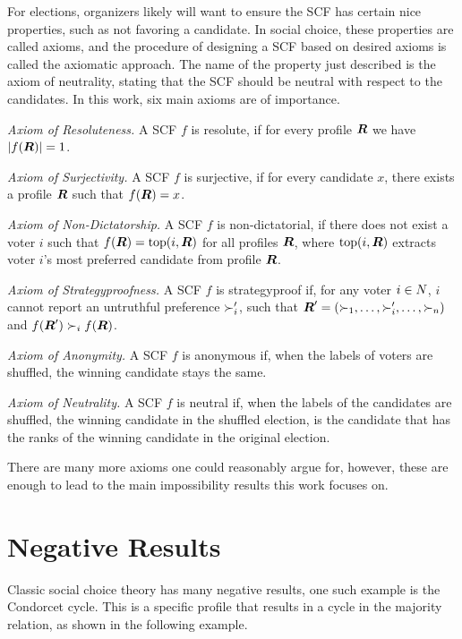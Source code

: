 For elections, organizers likely will want to ensure the SCF has certain
nice properties, such as not favoring a candidate. In social choice, these
properties are called axioms, and the procedure of designing a SCF based on
desired axioms is called the axiomatic approach. The name of the property just
described is the axiom of neutrality, stating that the SCF should be
neutral with respect to the candidates. In this work, six main axioms are of
importance.

\emph{Axiom of Resoluteness.} A SCF $f$ is resolute, if for every profile
$\boldsymbol{R}$ we have $|f(\boldsymbol{R})| = 1$.

\emph{Axiom of Surjectivity.} A SCF $f$ is surjective, if for every candidate
$x$, there exists a profile $\boldsymbol{R}$ such that
$f(\boldsymbol{R}) = x$.

\emph{Axiom of Non-Dictatorship.} A SCF $f$ is non-dictatorial, if there does not exist a voter $i$ such that $f(\boldsymbol{R}) = \textnormal{top}(i,\boldsymbol{R})$ for all profiles $\boldsymbol{R}$, where $\textnormal{top}(i,\boldsymbol{R})$  extracts voter $i$'s most preferred candidate from profile $\boldsymbol{R}$.

\emph{Axiom of Strategyproofness.} A SCF $f$ is strategyproof if, for any
voter $i \in N$, $i$ cannot report an untruthful preference
$\succ_i'$, such that  $\boldsymbol{R}' = (\succ_{1}, \dots,
	\succ_{i}', \dots, \succ_{n})$ and $f(\boldsymbol{R}') \succ_i
	f(\boldsymbol{R})$.

\emph{Axiom of Anonymity.} A SCF $f$ is anonymous if, when the labels of voters
are shuffled, the winning candidate stays the same.

\emph{Axiom of Neutrality.} A SCF $f$ is neutral if, when the labels of the
candidates are shuffled, the winning candidate in the shuffled election, is
the candidate that has the ranks of the winning candidate in the original
election.

There are many more axioms one could reasonably argue for, however, these are
enough to lead to the main impossibility results this work focuses on.

\section{Negative Results}
\label{preliminaries: negative results}

Classic social choice theory has many negative results, one such example is the
Condorcet cycle. This is a specific profile that results in a cycle in the
majority relation, as shown in the following example.

